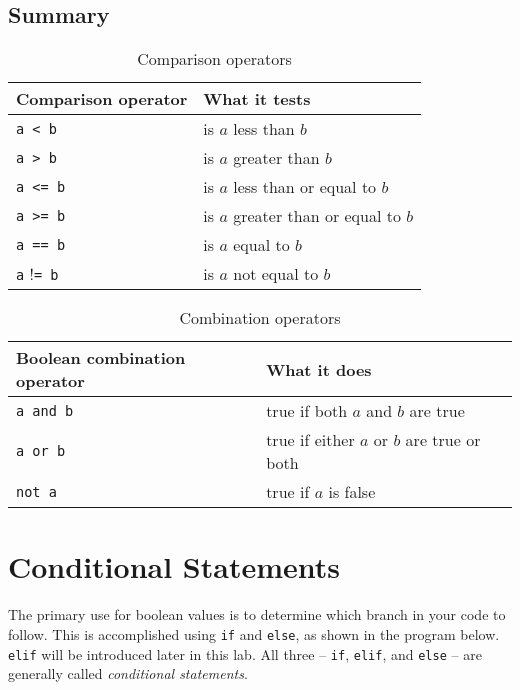 \documentclass[11pt,hidelinks]{article}
\begin{document}
\subsection{Summary}

\begin{table}[!ht]
  \centering
  \begin{tabular}{ll}
    \toprule
    Comparison operator & What it tests\\
    \midrule
    \lstinline!a < b! & is $a$ less than $b$ \\
    \lstinline!a > b! & is $a$ greater than $b$ \\
    \lstinline!a <= b! & is $a$ less than or equal to $b$ \\
    \lstinline!a >= b! & is $a$ greater than or equal to $b$ \\
    \lstinline!a == b! & is $a$ equal to $b$ \\
    \lstinline!a! !\lstinline!= b! & is $a$ not equal to $b$ \\
    \bottomrule
  \end{tabular}
  \caption{Comparison operators}
  \label{tab:cmpops}
\end{table}

\begin{table}
  \centering
  \begin{tabular}{ll}
    \toprule
    Boolean combination operator & What it does \\
    \midrule
    \lstinline!a and b! & true if both $a$ and $b$ are true \\
    \lstinline!a or b! & true if either $a$ or $b$ are true or both\\
    \lstinline!not a! & true if $a$ is false\\
    \bottomrule
  \end{tabular}
  \caption{Combination operators}
  \label{tab:cmbops}
\end{table}

\pagebreak
\section{Conditional Statements}

The primary use for boolean values is to determine which branch in your code to
follow. This is accomplished using \lstinline{if} and \lstinline{else}, as shown
in the program below. \lstinline!elif! will be introduced later in this lab. All
three -- \lstinline!if!, \lstinline!elif!, and \lstinline!else! -- are generally
called \emph{conditional statements}.
\end{document}
